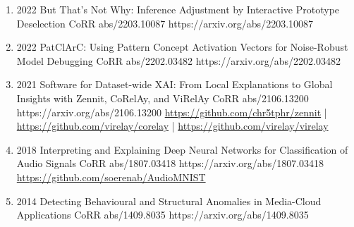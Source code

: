 {\begin{enumerate}
        \item {}
                            {2022}
                            {But That's Not Why: Inference Adjustment by Interactive Prototype Deselection}
                            {CoRR abs/2203.10087}
                            {https://arxiv.org/abs/2203.10087}

        \item {}
                            {2022}
                            {PatClArC: Using Pattern Concept Activation Vectors for Noise-Robust Model Debugging}
                            {CoRR abs/2202.03482}
                            {https://arxiv.org/abs/2202.03482}

        \item {}
                            {2021}
                            {Software for Dataset-wide XAI: From Local Explanations to Global Insights with Zennit, CoRelAy, and ViRelAy}
                            {CoRR abs/2106.13200}
                            {https://arxiv.org/abs/2106.13200}
                            {   \href{https://github.com/chr5tphr/zennit}{https://github.com/chr5tphr/zennit} | \\
                                \href{https://github.com/virelay/corelay}{https://github.com/virelay/corelay} |
                                \href{https://github.com/virelay/virelay}{https://github.com/virelay/virelay}
                            }

        \item {}
                            {2018}
                            {Interpreting and Explaining Deep Neural Networks for Classification of Audio Signals}
                            {CoRR abs/1807.03418}
                            {https://arxiv.org/abs/1807.03418}
                            {\href{https://github.com/soerenab/AudioMNIST}{https://github.com/soerenab/AudioMNIST}}

        \item {}
                            {2014}
                            {Detecting Behavioural and Structural Anomalies in Media-Cloud Applications}
                            {CoRR abs/1409.8035}
                            {https://arxiv.org/abs/1409.8035}

    \end{enumerate}

}
